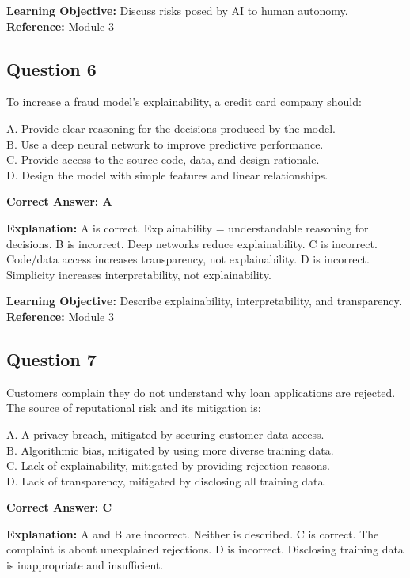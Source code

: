 \documentclass[11pt]{article}
\begin{document}
	\textbf{Learning Objective:} Discuss risks posed by AI to human autonomy.
	\textbf{Reference:} Module 3
	
	\subsection*{Question 6}
	To increase a fraud model's explainability, a credit card company should:
	
	A. Provide clear reasoning for the decisions produced by the model.\\
	B. Use a deep neural network to improve predictive performance.\\
	C. Provide access to the source code, data, and design rationale.\\
	D. Design the model with simple features and linear relationships.
	
	\vspace{0.4em}
	\textbf{Correct Answer: A}
	
	\textbf{Explanation:}
	A is correct. Explainability = understandable reasoning for decisions.
	B is incorrect. Deep networks reduce explainability.
	C is incorrect. Code/data access increases transparency, not
	explainability.
	D is incorrect. Simplicity increases interpretability, not
	explainability.
	
	\textbf{Learning Objective:} Describe explainability, interpretability,
	and transparency.
	\textbf{Reference:} Module 3
	
	\subsection*{Question 7}
	Customers complain they do not understand why loan applications are
	rejected. The source of reputational risk and its mitigation is:
	
	A. A privacy breach, mitigated by securing customer data access.\\
	B. Algorithmic bias, mitigated by using more diverse training data.\\
	C. Lack of explainability, mitigated by providing rejection reasons.\\
	D. Lack of transparency, mitigated by disclosing all training data.
	
	\vspace{0.4em}
	\textbf{Correct Answer: C}
	
	\textbf{Explanation:}
	A and B are incorrect. Neither is described.
	C is correct. The complaint is about unexplained rejections.
	D is incorrect. Disclosing training data is inappropriate and
	insufficient.
	
\end{document}
